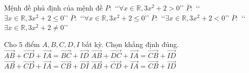 \begin{ex}%
	Mệnh đề phủ định của mệnh đề $P \colon$ \lq\lq $\forall x \in \mathbb{R}, 3x^2+2>0$\rq\rq {}
	\choice
	{\True $\overline{P} \colon$ \lq\lq $\exists x \in \mathbb{R}, 3x^2+2 \le 0$\rq\rq}
	{$\overline{P} \colon$ \lq\lq $\forall x \in \mathbb{R}, 3x^2+2 \le 0$\rq\rq}
	{$\overline{P} \colon$ \lq\lq $\exists x \in \mathbb{R}, 3x^2+2 < 0$\rq\rq}
	{$\overline{P} \colon$ \lq\lq $\exists x \in \mathbb{R}, 3x^2+2 \ne 0$\rq\rq}
\end{ex}

\begin{ex}%
	Cho $5$ điểm $A, B, C, D,I$ bất kỳ. Chọn khẳng định đúng.
	\choice
	{$\overrightarrow{AB}+\overrightarrow{CD}+\overrightarrow{IA}=\overrightarrow{BC}+\overrightarrow{ID}$}
	{$\overrightarrow{AB}+\overrightarrow{DC}+\overrightarrow{IA}=\overrightarrow{CB}+\overrightarrow{ID}$}
	{$\overrightarrow{AB}+\overrightarrow{CD}+\overrightarrow{IA}=\overrightarrow{CB}+\overrightarrow{DI}$}
	{\True $\overrightarrow{AB}+\overrightarrow{CD}+\overrightarrow{IA}=\overrightarrow{CB}+\overrightarrow{ID}$}
\end{ex}

